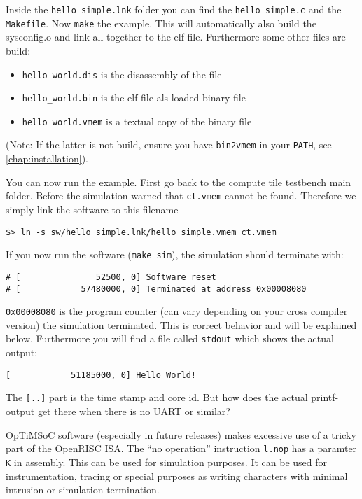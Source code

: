 Inside the \verb|hello_simple.lnk| folder you can find the
\verb|hello_simple.c| and the \verb|Makefile|. Now \verb|make| the
example. This will automatically also build the sysconfig.o and link
all together to the elf file. Furthermore some other files are build:

\begin{itemize}
\item \verb|hello_world.dis| is the disassembly of the file
\item \verb|hello_world.bin| is the elf file als loaded binary file
\item \verb|hello_world.vmem| is a textual copy of the binary file
\end{itemize}

(Note: If the latter is not build, ensure you have \verb|bin2vmem| in
your \verb|PATH|, see
\ref{chap:installation}).

You can now run the example. First go back to the compute tile
testbench main folder. Before the simulation warned that
\verb|ct.vmem| cannot be found. Therefore we simply link the software
to this filename

\begin{lstlisting}
$> ln -s sw/hello_simple.lnk/hello_simple.vmem ct.vmem
\end{lstlisting}

If you now run the software (\verb|make sim|), the simulation should
terminate with:

\begin{lstlisting}
# [               52500, 0] Software reset
# [            57480000, 0] Terminated at address 0x00008080
\end{lstlisting}

\verb|0x00008080| is the program counter (can vary depending on your cross
compiler version) the simulation terminated. This is correct behavior
and will be explained below. Furthermore you will find a file called
\verb|stdout| which shows the actual output:

\begin{lstlisting}
[            51185000, 0] Hello World!
\end{lstlisting}

The \verb|[..]| part is the time stamp and core id. But how does the
actual printf-output get there when there is no UART or similar?

OpTiMSoC software (especially in future releases) makes excessive use
of a tricky part of the OpenRISC ISA. The ``no operation'' instruction
\verb|l.nop| has a paramter \verb|K| in assembly. This can be used for
simulation purposes. It can be used for instrumentation, tracing or
special purposes as writing characters with minimal intrusion or
simulation termination.

